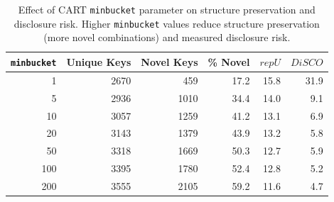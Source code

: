 \begin{table}[h]
\footnotesize\sf\centering
\caption{Effect of CART \texttt{minbucket} parameter on structure preservation and disclosure risk. Higher \texttt{minbucket} values reduce structure preservation (more novel combinations) and measured disclosure risk.\label{tab:minbucket_effect}}
\begin{tabular}{@{}rrrrrr@{}}
\toprule
\texttt{minbucket} & Unique Keys & Novel Keys & \% Novel & $repU$ & $DiSCO$ \\
\midrule
1 & 2670 & 459 & 17.2 & 15.8 & 31.9 \\
5 & 2936 & 1010 & 34.4 & 14.0 & 9.1 \\
10 & 3057 & 1259 & 41.2 & 13.1 & 6.9 \\
20 & 3143 & 1379 & 43.9 & 13.2 & 5.8 \\
50 & 3318 & 1669 & 50.3 & 12.7 & 5.9 \\
100 & 3395 & 1780 & 52.4 & 12.8 & 5.2 \\
200 & 3555 & 2105 & 59.2 & 11.6 & 4.7 \\
\bottomrule
\end{tabular}
\end{table}


